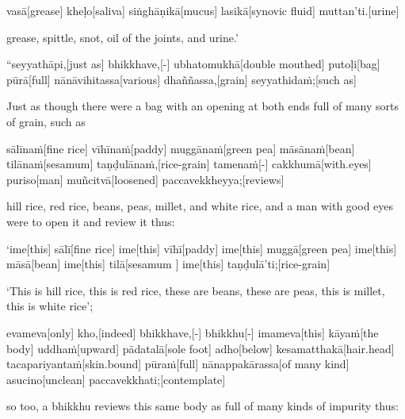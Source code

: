 \begin{samepage}
\begingl[glneveryline={\PaliGlossA,\PaliGlossB}]
vasā[grease] kheḷo[saliva] siṅghāṇikā[mucus] lasikā[synovic fluid] muttan’ti.[urine]
\endgl
\nopagebreak
\linespread{0.5}
\begin{spacin}{0.2}
{\PaliGlossFT grease, spittle, snot, oil of the joints, and urine.’}
\end{spacin}
\vskip 12pt
\end{samepage}
\begin{samepage}
\begingl[glneveryline={\PaliGlossA,\PaliGlossB}]
“seyyathāpi,[just as] bhikkhave,[-] ubhatomukhā[double mouthed] putoḷi[bag] pūrā[full] nānāvihitassa[various] dhaññassa,[grain] seyyathidaṁ;[such as]
\endgl
\nopagebreak
\linespread{0.5}
\begin{spacin}{0.2}
{\PaliGlossFT Just as though there were a bag with an opening at both ends full of many sorts of grain, such as}
\end{spacin}
\vskip 12pt
\end{samepage}
\begin{samepage}
\begingl[glneveryline={\PaliGlossA,\PaliGlossB}]
sālīnaṁ[fine rice] vīhīnaṁ[paddy] muggānaṁ[green pea] māsānaṁ[bean] tilānaṁ[sesamum] taṇḍulānaṁ,[rice-grain] tamenaṁ[-] cakkhumā[with.eyes] puriso[man] muñcitvā[loosened] paccavekkheyya;[reviews]
\endgl
\nopagebreak
\linespread{0.5}
\begin{spacin}{0.2}
{\PaliGlossFT hill rice, red rice, beans, peas, millet, and white rice, and a man with good eyes were to open it and review it thus:}
\end{spacin}
\vskip 12pt
\end{samepage}
\begin{samepage}
\begingl[glneveryline={\PaliGlossA,\PaliGlossB}]
‘ime[this] sālī[fine rice] ime[this] vīhī[paddy] ime[this] muggā[green pea] ime[this] māsā[bean] ime[this] tilā[sesamum ] ime[this] taṇḍulā’ti;[rice-grain]
\endgl
\nopagebreak
\linespread{0.5}
\begin{spacin}{0.2}
{\PaliGlossFT ‘This is hill rice, this is red rice, these are beans, these are peas, this is millet, this is white rice’;}
\end{spacin}
\vskip 12pt
\end{samepage}
\begin{samepage}
\begingl[glneveryline={\PaliGlossA,\PaliGlossB}]
evameva[only] kho,[indeed] bhikkhave,[-] bhikkhu[-] imameva[this] kāyaṁ[the body] uddhaṁ[upward] pādatalā[sole foot] adho[below] kesamatthakā[hair.head] tacapariyantaṁ[skin.bound] pūraṁ[full] nānappakārassa[of many kind] asucino[unclean] paccavekkhati;[contemplate]
\endgl
\nopagebreak
\linespread{0.5}
\begin{spacin}{0.2}
{\PaliGlossFT so too, a bhikkhu reviews this same body as full of many kinds of impurity thus:}
\end{spacin}
\vskip 12pt
\end{samepage}
